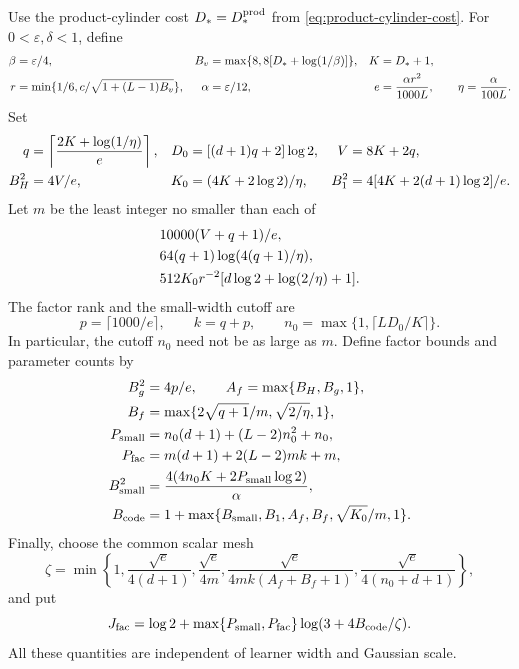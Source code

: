 Use the product-cylinder cost $D_*=D_*^{\rm prod}$ from
\eqref{eq:product-cylinder-cost}. For $0<\varepsilon,\delta<1$, define
\begin{align}
 \beta&=\varepsilon/4,&
 B_v&=\max\{8,8[D_*+\log(1/\beta)]\},&
 K&=D_*+1,\notag\\
 r&=\min\{1/6,c/\sqrt{1+(L-1)B_v}\},&
 \alpha&=\varepsilon/12,&
 e&=\frac{\alpha r^2}{1000L},\qquad
 \eta=\frac{\alpha}{100L}.
 \label{eq:factor-posterior-budgets}
\end{align}
Set
\begin{align}
 q&=\left\lceil\frac{2K+\log(1/\eta)}e\right\rceil,&
 D_0&=[(d+1)q+2]\log2,&
 V&=8K+2q,\notag\\
 B_H^2&=4V/e,&
 K_0&=(4K+2\log2)/\eta,&
 B_1^2&=4[4K+2(d+1)\log2]/e.
 \label{eq:factor-active-budgets}
\end{align}
Let $m$ be the least integer no smaller than each of
\begin{align}
 &10000(V+q+1)/e,\notag\\
 &64(q+1)\log(4(q+1)/\eta),\label{eq:factor-source-width}\\
 &512K_0r^{-2}[d\log2+\log(2/\eta)+1].\notag
\end{align}
The factor rank and the small-width cutoff are
\begin{equation}\label{eq:factor-rank-cutoff}
 p=\lceil1000/e\rceil,\qquad k=q+p,\qquad
 n_0=\max\{1,\lceil LD_0/K\rceil\}.
\end{equation}
In particular, the cutoff $n_0$ need not be as large as $m$.
Define factor bounds and parameter counts by
\begin{align}
 B_g^2&=4p/e,\qquad A_f=\max\{B_H,B_g,1\},\notag\\
 B_f&=\max\{2\sqrt{q+1}/m,\sqrt{2/\eta},1\},\notag\\
 P_{\rm small}&=n_0(d+1)+(L-2)n_0^2+n_0,\notag\\
 P_{\rm fac}&=m(d+1)+2(L-2)mk+m,\notag\\
 B_{\rm small}^2&=\frac{4(4n_0K+2P_{\rm small}\log2)}\alpha,\notag\\
 B_{\rm code}&=1+\max\{B_{\rm small},B_1,A_f,B_f,
                                      \sqrt{K_0}/m,1\}.
 \label{eq:factor-code-bounds}
\end{align}
Finally, choose the common scalar mesh
\begin{equation}\label{eq:factor-mesh}
 \zeta=\min\left\{1,
 \frac{\sqrt e}{4(d+1)},\frac{\sqrt e}{4m},
 \frac{\sqrt e}{4mk(A_f+B_f+1)},
 \frac{\sqrt e}{4(n_0+d+1)}\right\},
\end{equation}
and put
\begin{equation}\label{eq:factor-code-budget}
 J_{\rm fac}=\log2+
 \max\{P_{\rm small},P_{\rm fac}\}
               \log(3+4B_{\rm code}/\zeta).
\end{equation}
All these quantities are independent of learner width and Gaussian scale.

